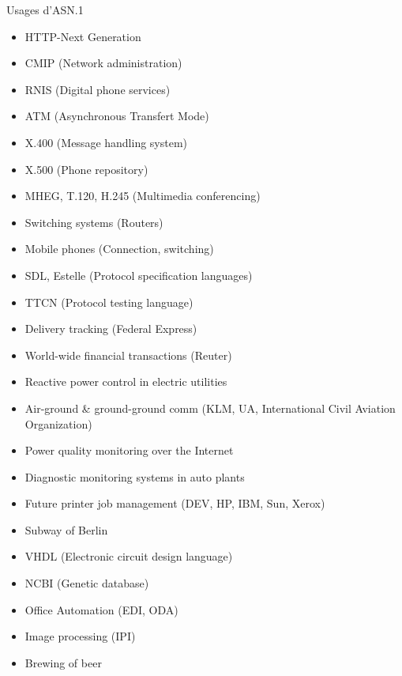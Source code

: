 \begin{slide}
\begin{block} {Usages d'ASN.1} \end{block}
\begin{itemize}
  \item HTTP-Next Generation
  \item CMIP (Network administration)
  \item RNIS (Digital phone services)
  \item ATM (Asynchronous Transfert Mode)
  \item X.400 (Message handling system)
  \item X.500 (Phone repository)
  \item MHEG, T.120, H.245 (Multimedia conferencing)
  \item Switching systems (Routers)
  \item Mobile phones (Connection, switching)
  \item SDL, Estelle (Protocol specification languages)
  \item TTCN (Protocol testing language)
  \item Delivery tracking (Federal Express)
  \item World-wide financial transactions (Reuter)
  \item Reactive power control in electric utilities
\end{itemize}

\begin{itemize}
  \item Air-ground \& ground-ground comm (KLM, UA, International Civil
Aviation Organization)
  \item Power quality monitoring over the Internet
  \item Diagnostic monitoring systems in auto plants
  \item Future printer job management (DEV, HP, IBM, Sun, Xerox)
  \item Subway of Berlin
  \item VHDL (Electronic circuit design language)
  \item NCBI (Genetic database)
  \item Office Automation (EDI, ODA)
  \item Image processing (IPI)
  \item Brewing of beer
\end{itemize}
\end{slide}




